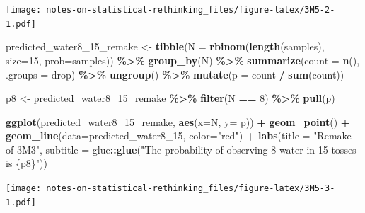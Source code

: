 \documentclass[
]{book}
\newenvironment{Shaded}{\begin{snugshade}}{\end{snugshade}}
\newcommand{\DataTypeTok}[1]{\textcolor[rgb]{0.13,0.29,0.53}{#1}}
\newcommand{\DecValTok}[1]{\textcolor[rgb]{0.00,0.00,0.81}{#1}}
\newcommand{\KeywordTok}[1]{\textcolor[rgb]{0.13,0.29,0.53}{\textbf{#1}}}
\newcommand{\NormalTok}[1]{#1}
\newcommand{\OperatorTok}[1]{\textcolor[rgb]{0.81,0.36,0.00}{\textbf{#1}}}
\newcommand{\StringTok}[1]{\textcolor[rgb]{0.31,0.60,0.02}{#1}}
\begin{document}
\texttt{[image: notes-on-statistical-rethinking\_files/figure-latex/3M5-2-1.pdf]}

\begin{Shaded}
\begin{Highlighting}[]
\NormalTok{predicted\_water8\_}\DecValTok{15}\NormalTok{\_remake \textless{}{-}}\StringTok{ }
\StringTok{  }\KeywordTok{tibble}\NormalTok{(}\DataTypeTok{N =} \KeywordTok{rbinom}\NormalTok{(}\KeywordTok{length}\NormalTok{(samples), }\DataTypeTok{size=}\DecValTok{15}\NormalTok{, }\DataTypeTok{prob=}\NormalTok{samples)) }\OperatorTok{\%\textgreater{}\%}
\StringTok{  }\KeywordTok{group\_by}\NormalTok{(N) }\OperatorTok{\%\textgreater{}\%}
\StringTok{  }\KeywordTok{summarize}\NormalTok{(}\DataTypeTok{count =} \KeywordTok{n}\NormalTok{(), }\DataTypeTok{.groups =} \StringTok{\textquotesingle{}drop\textquotesingle{}}\NormalTok{)  }\OperatorTok{\%\textgreater{}\%}
\StringTok{  }\KeywordTok{ungroup}\NormalTok{() }\OperatorTok{\%\textgreater{}\%}
\StringTok{  }\KeywordTok{mutate}\NormalTok{(}\DataTypeTok{p =}\NormalTok{ count }\OperatorTok{/}\StringTok{ }\KeywordTok{sum}\NormalTok{(count))}
  
\NormalTok{p8 \textless{}{-}}\StringTok{ }
\StringTok{  }\NormalTok{predicted\_water8\_}\DecValTok{15}\NormalTok{\_remake }\OperatorTok{\%\textgreater{}\%}
\StringTok{  }\KeywordTok{filter}\NormalTok{(N }\OperatorTok{==}\StringTok{ }\DecValTok{8}\NormalTok{) }\OperatorTok{\%\textgreater{}\%}
\StringTok{  }\KeywordTok{pull}\NormalTok{(p)}

\KeywordTok{ggplot}\NormalTok{(predicted\_water8\_}\DecValTok{15}\NormalTok{\_remake, }\KeywordTok{aes}\NormalTok{(}\DataTypeTok{x=}\NormalTok{N, }\DataTypeTok{y=}\NormalTok{ p)) }\OperatorTok{+}\StringTok{ }
\StringTok{  }\KeywordTok{geom\_point}\NormalTok{() }\OperatorTok{+}\StringTok{ }
\StringTok{  }\KeywordTok{geom\_line}\NormalTok{(}\DataTypeTok{data=}\NormalTok{predicted\_water8\_}\DecValTok{15}\NormalTok{, }\DataTypeTok{color=}\StringTok{"red"}\NormalTok{) }\OperatorTok{+}
\StringTok{  }\KeywordTok{labs}\NormalTok{(}\DataTypeTok{title =} \StringTok{"Remake of 3M3"}\NormalTok{,}
       \DataTypeTok{subtitle =}\NormalTok{ glue}\OperatorTok{::}\KeywordTok{glue}\NormalTok{(}\StringTok{"The probability of observing 8 water in 15 tosses is \{p8\}"}\NormalTok{))}
\end{Highlighting}
\end{Shaded}

\texttt{[image: notes-on-statistical-rethinking\_files/figure-latex/3M5-3-1.pdf]}
\end{document}
